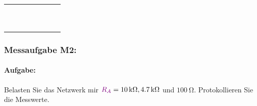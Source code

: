 \documentclass[11pt,a4paper,titlepage,parskip=half]{scrreprt}
\begin{document}
\begin{center}
\begin{table}[H]
\begin{center}
\begin{tabular}{c|c|c|c|c|c|c}
                                \quad\quad\quad & \quad\quad\quad &\quad\quad\quad & \quad\quad\quad & \quad\quad\quad & \quad\quad\quad & \quad\quad\quad\\\hline
                                 &  &  &  &  &  & \\\hline
                                 &  &  &  &  &  & \\\hline
                                 &  &  &  &  &  & \\\hline
                                 &  &  &  &  &  & \\\hline
                                 &  &  &  &  &  & \\\hline
                                 &  &  &  &  &  & \\\hline
                                 &  &  &  &  &  & \\\hline
                                 &  &  &  &  &  & \\\hline
                                 &  &  &  &  &  & \\
                            \end{tabular}
                        \end{center}
                    \end{table}
                \end{center}
           \subsubsection{Messaufgabe M2:}
               \paragraph{Aufgabe:}Belasten Sie das Netzwerk mir $\textcolor{violet}{R_A} = \SI{10}{\kilo\ohm}, \SI{4,7}{\kilo\ohm}$ und $\SI{100}{\ohm}$.
               Protokollieren Sie die Messwerte.
\end{document}
